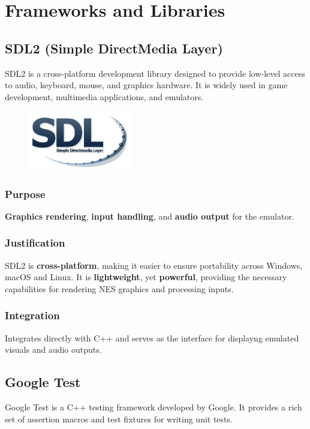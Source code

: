 \documentclass[a4paper, 11pt]{article}
\begin{document}
\newpage\section{Frameworks and Libraries}

\subsection{SDL2 (Simple DirectMedia Layer)}
SDL2 is a cross-platform development library designed to provide low-level access to audio, keyboard, mouse, and graphics hardware. It is widely used in game development, multimedia applications, and emulators.

\begin{figure}[h]
    \centering
    \includegraphics[width=0.4\textwidth]{sdl.png}
\end{figure}

\subsubsection{Purpose}
\textbf{Graphics rendering}, \textbf{input handling}, and \textbf{audio output} for the emulator.

\subsubsection{Justification}
SDL2 is \textbf{cross-platform}, making it easier to ensure portability across Windows, macOS and Linux. It is \textbf{lightweight}, yet \textbf{powerful}, providing the necessary capabilities for rendering NES graphics and processing inputs.

\subsubsection{Integration}
Integrates directly with C++ and serves as the interface for displayng emulated visuals and audio outputs.

\newpage\subsection{Google Test}
Google Test is a C++ testing framework developed by Google. It provides a rich set of assertion macros and test fixtures for writing unit tests.
\end{document}
